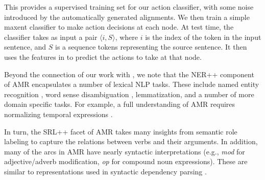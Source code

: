 \documentclass[11pt]{article}
\newcommand\e[1]{\textit{#1}} %
\begin{document}
This provides a supervised training set for our action classifier, with some noise introduced by the automatically generated alignments.
We then train a simple maxent classifier to make action decisions at each node. 
At test time,
  the classifier takes as input a pair $\langle i, S \rangle$, where $i$ is the 
  index of the token in the input sentence, and $S$ is a sequence tokens 
  representing the source sentence.
It then uses the features in  to predict the actions to take at
  that node.


%
%
%
%






Beyond the connection of our work with , we note that 
the NER++ component of AMR encapsulates a number of lexical NLP tasks.
These include named entity recognition \cite{2007nadeau-ner,stanford-ner},
  word sense disambiguation \cite{1995yarowsky-wsd,2002banerjee-wsd},
  lemmatization, and a number of more domain specific tasks.
For example, a full understanding of AMR requires normalizing temporal
  expressions \cite{2010verhagen-tempeval,2010strotgen-temporal,2012chang-temporal}.
 
In turn, the SRL++ facet of AMR takes many insights from semantic role labeling
  \cite{2002gildea-srl,2004punyakanok-srl,srikumar2013-srl} to capture the
  relations between verbs and their arguments.
In addition, many of the arcs in AMR have nearly syntactic interpretations
  (e.g., \e{mod} for adjective/adverb modification, \e{op} for compound noun
  expressions).
These are similar to representations used in syntactic dependency parsing
  \cite{stanford-dependencies,2005mcdonald-dependency0,2006buchholz-conll}.
\end{document}
